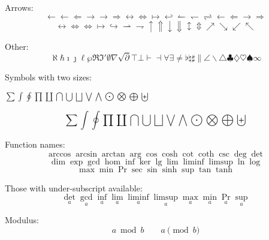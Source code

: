 Arrows:
\begin{equation}
\leftarrow \gets \Leftarrow \rightarrow \to \Rightarrow \leftrightarrow \Leftrightarrow \mapsto \hookleftarrow \leftharpoonup \leftharpoondown \rightleftharpoons \longleftarrow \Longleftarrow \longrightarrow \Longrightarrow 
\end{equation}
\begin{equation}
\longleftrightarrow \Longleftrightarrow \iff \longmapsto \hookrightarrow \rightharpoonup \rightharpoondown \uparrow \Uparrow \downarrow \Downarrow \updownarrow \Updownarrow \nearrow \searrow \swarrow \nwarrow
\end{equation}

Other:
\begin{equation}
\aleph \hbar \imath \jmath \ell \wp \Re \Im \prime \emptyset \nabla \surd \partial \top \bot \vdash \dashv \forall \exists \neq \flat \natural \sharp \| \angle \backslash \triangle \clubsuit \diamondsuit \heartsuit \spadesuit \infty
\end{equation}%

Symbols with two sizes: 
\begin{center}
\(\sum \int \oint \prod \coprod \bigcap \bigcup \bigsqcup \bigvee \bigwedge \bigodot \bigotimes \bigoplus \biguplus\)
\end{center}
\begin{equation}
\sum \int \oint \prod \coprod \bigcap \bigcup \bigsqcup \bigvee \bigwedge \bigodot \bigotimes \bigoplus \biguplus
\end{equation}

Function names:
\begin{equation}
\arccos \arcsin \arctan \arg \cos \cosh \cot \coth \csc \deg \det 
\end{equation}
\begin{equation}
\dim \exp \gcd \hom \inf \ker \lg \lim \liminf \limsup \ln \log 
\end{equation}
\begin{equation}
\max \min \Pr \sec \sin \sinh \sup \tan \tanh
\end{equation}

Those with under-subscript available:
\begin{equation}
\det_{a} \gcd_{a} \inf_{a} \lim_{a} \liminf_{a} \limsup_{a} \max_{a} \min_{a} \Pr_{a} \sup_{a}
\end{equation}

Modulus:
\begin{equation}
a \bmod b \qquad a \pmod{b}
\end{equation}

